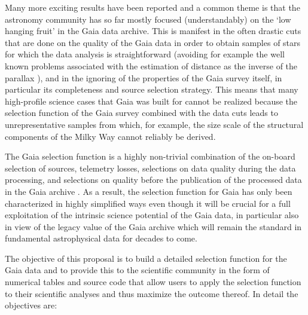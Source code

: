 Many more exciting results have been reported and a common theme is that the astronomy community has so far mostly
focused (understandably) on the `low hanging fruit' in the Gaia data archive. This is manifest in the often drastic cuts
that are done on the quality of the Gaia data in order to obtain samples of stars for which the data analysis is
straightforward (avoiding for example the well known problems associated with the estimation of distance as the inverse
of the parallax \cite{2018A&A...616A...9L}), and in the ignoring of the properties of the Gaia survey itself, in
particular its completeness and source selection strategy. This means that many high-profile science cases that Gaia was
built for cannot be realized because the selection function of the Gaia survey combined with the data cuts leads to
unrepresentative samples from which, for example, the size scale of the structural components of the Milky Way cannot
reliably be derived.

The Gaia selection function is a highly non-trivial combination of the on-board selection of sources, telemetry
losses, selections on data quality during the data processing, and selections on quality before the publication of the
processed data in the Gaia archive . As a result, the
selection function for Gaia has only been characterized in highly simplified ways  even though it will be crucial for a full exploitation of the intrinsic science
potential of the Gaia data, in particular also in view of the legacy value of the Gaia archive which will remain
the standard in fundamental astrophysical data for decades to come.

The objective of this proposal is to build a detailed selection function for the Gaia data and to provide this to the
scientific community in the form of numerical tables and source code that allow users to apply the selection function to
their scientific analyses and thus maximize the outcome thereof. In detail the objectives are:

